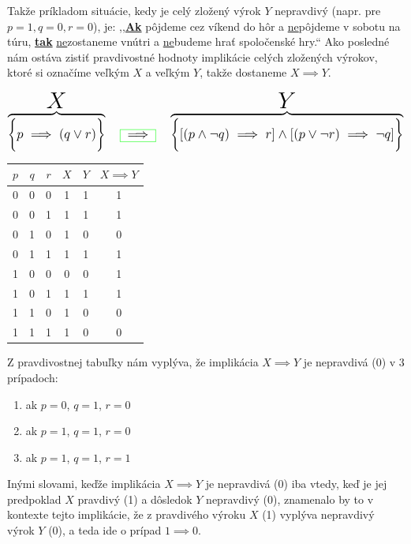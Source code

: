 \documentclass{article}
\begin{document}
Takže príkladom situácie, kedy je celý zložený výrok $Y$ nepravdivý (napr. pre $p=1, q=0, r=0$), je: 
,,\underline{\textbf{Ak}} pôjdeme cez víkend do hôr a \underline{ne}pôjdeme v sobotu na túru, \underline{\textbf{tak}} \underline{ne}zostaneme vnútri a \underline{ne}budeme hrať spoločenské hry.“
\newpage
Ako posledné nám ostáva zistiť pravdivostné hodnoty implikácie celých zložených výrokov, ktoré si označíme veľkým $X$ a veľkým $Y$, takže dostaneme $X \implies Y$.
\vspace{5mm}
\[
\large 
\overbrace{\displaystyle \bigg\{p \implies (q \lor r)\bigg\}}^{\text{\huge $X$}\rule{0pt}{3.5ex}}
\quad 
\fcolorbox{green}{white}{$\implies$} 
\quad 
\overbrace{\displaystyle \bigg\{[(p \land \neg q) \implies r] \land [(p \lor \neg r) \implies \neg q]\bigg\}}^{\text{\huge $Y$}\rule{0pt}{3.5ex}}
\]
\vspace{10mm}
\begin{center}
\large 
\renewcommand{\arraystretch}{1.2} 
\setlength{\tabcolsep}{6pt} 
\begin{tabular}{|c|c|c|c|c|c|}
\hline
$p$ & $q$ & $r$ & $X$ & $Y$ & $X \implies Y$ \\ \hline
0 & 0 & 0 & 1 & 1 & 1 \\ \hline
0 & 0 & 1 & 1 & 1 & 1 \\ \hline
0 & 1 & 0 & 1 & 0 & 0 \\ \hline
0 & 1 & 1 & 1 & 1 & 1 \\ \hline
1 & 0 & 0 & 0 & 0 & 1 \\ \hline
1 & 0 & 1 & 1 & 1 & 1 \\ \hline
1 & 1 & 0 & 1 & 0 & 0 \\ \hline
1 & 1 & 1 & 1 & 0 & 0 \\ \hline
\end{tabular}
\end{center}
\vspace{5mm}
Z pravdivostnej tabuľky nám vyplýva, že implikácia $X \implies Y$ je nepravdivá (0) v 3 prípadoch:
\begin{enumerate}[label=\alph*)]
    \item ak $p = 0$, $q = 1$, $r = 0$
    \item ak $p = 1$, $q = 1$, $r = 0$
    \item ak $p = 1$, $q = 1$, $r = 1$
\end{enumerate}
\vspace{5mm}
Inými slovami, keďže implikácia $X \implies Y$ je nepravdivá (0) iba vtedy, keď je jej predpoklad $X$ pravdivý (1) a dôsledok $Y$ nepravdivý (0), znamenalo by to v kontexte tejto implikácie, že z pravdivého výroku $X$ (1) vyplýva nepravdivý výrok $Y$ (0), a teda ide o prípad $1 \implies 0$.
\end{document}
